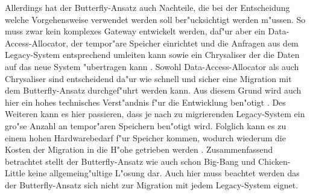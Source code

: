 Allerdings hat der Butterfly-Ansatz auch Nachteile, die bei der Entscheidung welche Vorgehensweise verwendet werden soll ber"ucksichtigt werden m"ussen. So muss zwar kein komplexes Gateway entwickelt werden, daf"ur aber ein Data-Access-Allocator, der tempor"are Speicher einrichtet und die Anfragen aus dem Legacy-System entsprechend umleiten kann sowie ein Chrysaliser der die Daten auf das neue System "ubertragen kann \citep[S.~3]{wuLawless-1997}. Sowohl Data-Access-Allocator als auch Chrysaliser sind entscheidend da"ur wie schnell und sicher eine Migration mit dem Butterfly-Ansatz durchgef"uhrt werden kann. Aus diesem Grund wird auch hier ein hohes technisches Verst"andnis f"ur die Entwicklung ben"otigt \citep[S.~204]{wuLawlessBisbal-1997}. Des Weiteren kann es hier passieren, dass je nach zu migrierenden Legacy-System ein gro"se Anzahl an tempor"aren Speichern ben"otigt wird. Folglich kann es zu einem hohen Hardwarebedarf f"ur Speicher kommen, wodurch wiederum die Kosten der Migration in die H"ohe getrieben werden \citep[S.~109f.]{bisbal-1999}.
\lb
Zusammenfassend betrachtet stellt der Butterfly-Ansatz wie auch schon Big-Bang und Chicken-Little keine allgemeing"ultige L"osung dar. Auch hier muss beachtet werden das der Butterfly-Ansatz sich nicht zur Migration mit jedem Legacy-System eignet. 
